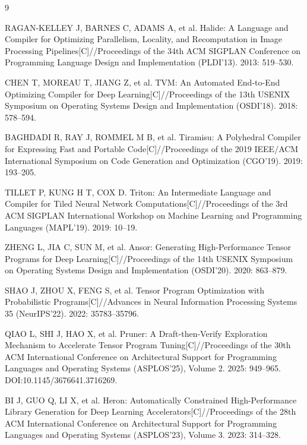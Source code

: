 \begin{thebibliography}{9}
\raggedright
RAGAN-KELLEY J, BARNES C, ADAMS A, et al. Halide: A Language and Compiler for Optimizing Parallelism, Locality, and Recomputation in Image Processing Pipelines[C]//Proceedings of the 34th ACM SIGPLAN Conference on Programming Language Design and Implementation (PLDI'13). 2013: 519--530.

CHEN T, MOREAU T, JIANG Z, et al. TVM: An Automated End-to-End Optimizing Compiler for Deep Learning[C]//Proceedings of the 13th USENIX Symposium on Operating Systems Design and Implementation (OSDI'18). 2018: 578--594.

BAGHDADI R, RAY J, ROMMEL M B, et al. Tiramisu: A Polyhedral Compiler for Expressing Fast and Portable Code[C]//Proceedings of the 2019 IEEE/ACM International Symposium on Code Generation and Optimization (CGO'19). 2019: 193--205.

TILLET P, KUNG H T, COX D. Triton: An Intermediate Language and Compiler for Tiled Neural Network Computations[C]//Proceedings of the 3rd ACM SIGPLAN International Workshop on Machine Learning and Programming Languages (MAPL'19). 2019: 10--19.

ZHENG L, JIA C, SUN M, et al. Ansor: Generating High-Performance Tensor Programs for Deep Learning[C]//Proceedings of the 14th USENIX Symposium on Operating Systems Design and Implementation (OSDI'20). 2020: 863--879.

SHAO J, ZHOU X, FENG S, et al. Tensor Program Optimization with Probabilistic Programs[C]//Advances in Neural Information Processing Systems 35 (NeurIPS'22). 2022: 35783--35796.

QIAO L, SHI J, HAO X, et al. Pruner: A Draft-then-Verify Exploration Mechanism to Accelerate Tensor Program Tuning[C]//Proceedings of the 30th ACM International Conference on Architectural Support for Programming Languages and Operating Systems (ASPLOS'25), Volume 2. 2025: 949--965. DOI:10.1145/3676641.3716269.

BI J, GUO Q, LI X, et al. Heron: Automatically Constrained High-Performance Library Generation for Deep Learning Accelerators[C]//Proceedings of the 28th ACM International Conference on Architectural Support for Programming Languages and Operating Systems (ASPLOS'23), Volume 3. 2023: 314--328.
\end{thebibliography}
